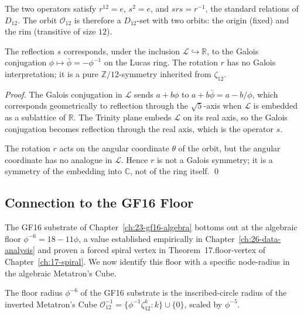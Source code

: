 The two operators satisfy $r^{12} = e$, $s^{2} = e$, and
$s r s = r^{-1}$, the standard relations of $D_{12}$. The orbit
$\mathcal{O}_{12}$ is therefore a $D_{12}$-set with two orbits: the
origin (fixed) and the rim (transitive of size $12$).

\begin{lemma}
\label{lem:13-galois}
The reflection $s$ corresponds, under the inclusion $\mathcal{L}
\hookrightarrow \mathbb{R}$, to the Galois conjugation
$\phi \mapsto \bar\phi = -\phi^{-1}$ on the Lucas ring. The
rotation $r$ has no Galois interpretation; it is a pure
$\mathbb{Z}/12$-symmetry inherited from $\zeta_{12}$.
\end{lemma}

\begin{proof}
The Galois conjugation in $\mathcal{L}$ sends $a + b\phi$ to
$a + b\bar\phi = a - b/\phi$, which corresponds geometrically to
reflection through the $\sqrt{5}$-axis when $\mathcal{L}$ is
embedded as a sublattice of $\mathbb{R}$. The Trinity plane embeds
$\mathcal{L}$ on its real axis, so the Galois conjugation becomes
reflection through the real axis, which is the operator $s$.

The rotation $r$ acts on the angular coordinate $\theta$ of the
orbit, but the angular coordinate has no analogue in $\mathcal{L}$.
Hence $r$ is not a Galois symmetry; it is a symmetry of the
embedding into $\mathbb{C}$, not of the ring itself. \qed
\end{proof}

\subsection{Connection to the GF16 Floor}
\label{sec:13-gf16}

The GF16 substrate of Chapter~\ref{ch:23-gf16-algebra} bottoms out
at the algebraic floor $\phi^{-6} = 18 - 11\phi$, a value
established empirically in Chapter~\ref{ch:26-data-analysis} and
proven a forced spiral vertex in Theorem~17.floor-vertex of
Chapter~\ref{ch:17-spiral}. We now identify this floor with a
specific node-radius in the algebraic Metatron's Cube.

\begin{lemma}
\label{lem:13-gf16-floor}
The floor radius $\phi^{-6}$ of the GF16 substrate is the
inscribed-circle radius of the inverted Metatron's Cube
$\mathcal{O}_{12}^{-1} = \{\phi^{-1} \zeta_{12}^{k} : k\} \cup
\{0\}$, scaled by $\phi^{-5}$.
\end{lemma}

